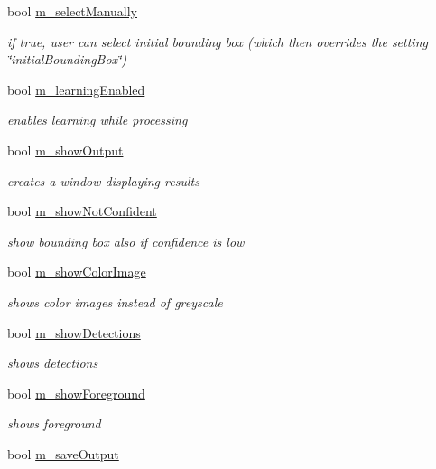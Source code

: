 \begin{DoxyCompactItemize}
bool \hyperlink{classtld_1_1Settings_afadc64d205d5386d94088e87dba72519}{m\-\_\-select\-Manually}
\begin{DoxyCompactList}\small\item\em if true, user can select initial bounding box (which then overrides the setting \char`\"{}initial\-Bounding\-Box\char`\"{}) \end{DoxyCompactList}\item 
bool \hyperlink{classtld_1_1Settings_abd4a98a18a910313cf3590f507f1ceef}{m\-\_\-learning\-Enabled}
\begin{DoxyCompactList}\small\item\em enables learning while processing \end{DoxyCompactList}\item 
bool \hyperlink{classtld_1_1Settings_abce1f9678efba0511db88545d97bb535}{m\-\_\-show\-Output}
\begin{DoxyCompactList}\small\item\em creates a window displaying results \end{DoxyCompactList}\item 
bool \hyperlink{classtld_1_1Settings_acd69b3d8edc2fe3a05bb763dfd17b30b}{m\-\_\-show\-Not\-Confident}
\begin{DoxyCompactList}\small\item\em show bounding box also if confidence is low \end{DoxyCompactList}\item 
bool \hyperlink{classtld_1_1Settings_a495b2aba7d0c9ec5fb914ab04b6d42cf}{m\-\_\-show\-Color\-Image}
\begin{DoxyCompactList}\small\item\em shows color images instead of greyscale \end{DoxyCompactList}\item 
bool \hyperlink{classtld_1_1Settings_abcc93dd632486081ba14ebfaaaecd392}{m\-\_\-show\-Detections}
\begin{DoxyCompactList}\small\item\em shows detections \end{DoxyCompactList}\item 
bool \hyperlink{classtld_1_1Settings_ab2398d08ccb9bab01c3240651d07f8c3}{m\-\_\-show\-Foreground}
\begin{DoxyCompactList}\small\item\em shows foreground \end{DoxyCompactList}\item 
bool \hyperlink{classtld_1_1Settings_a46de5897c9f1bc410c0f44f459181e05}{m\-\_\-save\-Output}

\end{DoxyCompactItemize}
